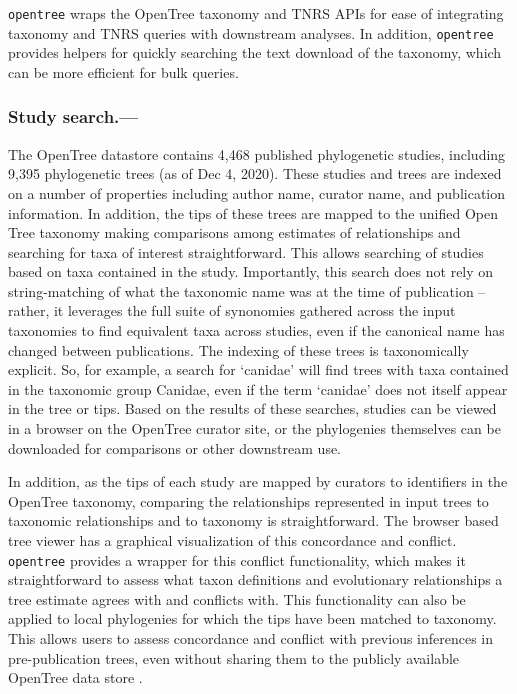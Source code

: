 \documentclass[oupdraft]{sysbio_sse}
\begin{document}
\texttt{opentree} wraps the OpenTree taxonomy and TNRS APIs for ease of integrating taxonomy and TNRS queries with downstream analyses. In addition, \texttt{opentree} provides helpers for quickly searching the text download of the taxonomy, which can be more efficient for bulk queries.


\subsubsection{Study search.---} The OpenTree datastore contains 4,468 published phylogenetic studies, including 9,395 phylogenetic trees (as of Dec 4, 2020).
These studies and trees are indexed on a number of properties including author name, curator name, and publication information.
In addition, the tips of these trees are mapped to the unified Open Tree taxonomy making comparisons among estimates of relationships and searching for taxa of interest straightforward.
This allows searching of studies based on taxa contained in the study.
Importantly, this search does not rely on string-matching of what the taxonomic name was at the time of publication -- rather, it leverages the full suite of synonomies gathered across the input taxonomies to find equivalent taxa across studies, even if the canonical name has changed between publications.
The indexing of these trees is taxonomically explicit.
So, for example, a search for `canidae' will find trees with taxa contained in the taxonomic group Canidae, even if the term `canidae' does not itself appear in the tree or tips.
Based on the results of these searches, studies can be viewed in a browser on the OpenTree curator site, or the phylogenies themselves can be downloaded for comparisons or other downstream use.

In addition, as the tips of each study are mapped by curators to identifiers in the OpenTree taxonomy, comparing the relationships represented in input trees to taxonomic relationships and to taxonomy is straightforward. The browser based tree viewer has a graphical visualization of this concordance and conflict. \texttt{opentree} provides a wrapper for this conflict functionality, which makes it straightforward to assess what taxon definitions and evolutionary relationships a tree estimate agrees with and conflicts with. This functionality can also be applied to local phylogenies for which the tips have been matched to taxonomy. This allows users to assess concordance and conflict with previous inferences in pre-publication trees, even without sharing them to the publicly available OpenTree data store \citep{reyes_physcraper_2020, mctavish_phylesystem_2015}.
\end{document}
